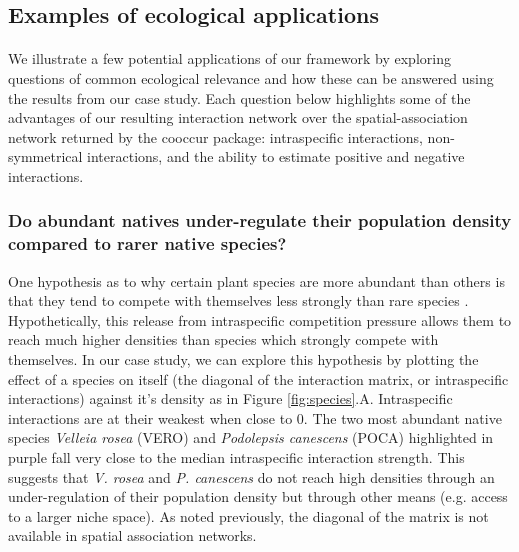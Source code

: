 \documentclass[a4,12pt]{article}
\begin{document}
    \subsection{Examples of ecological applications}

    \paragraph{}
    We illustrate a few potential applications of our framework by exploring questions of common ecological relevance and how these can be answered using the results from our case study. Each question below highlights some of the advantages of our resulting interaction network over the spatial-association network returned by the cooccur package: intraspecific interactions, non-symmetrical interactions, and the ability to estimate positive and negative interactions. 


    \subsubsection*{Do abundant natives under-regulate their population density compared to rarer native species?}
    One hypothesis as to why certain plant species are more abundant than others is that they tend to compete with themselves less strongly than rare species \parencite{Yenni2012, Yenni2017}. Hypothetically, this release from intraspecific competition pressure allows them to reach much higher densities than species which strongly compete with themselves. In our case study, we can explore this hypothesis by plotting the effect of a species on itself (the diagonal of the interaction matrix, or intraspecific interactions) against it's density as in Figure \ref{fig:species}.A. Intraspecific interactions are at their weakest when close to $0$. The two most abundant native species \textit{Velleia rosea} (VERO) and \textit{Podolepsis canescens} (POCA) highlighted in purple fall very close to the median intraspecific interaction strength. This suggests that \textit{V. rosea} and \textit{P. canescens} do not reach high densities through an under-regulation of their population density but through other means (e.g. access to a larger niche space). As noted previously, the diagonal of the matrix is not available in spatial association networks.
\end{document}
